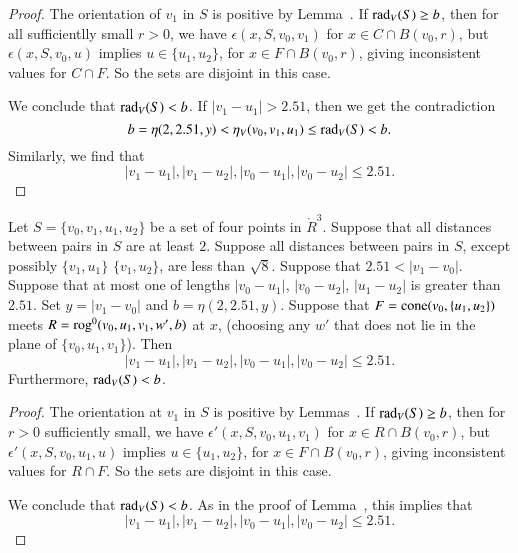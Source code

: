 \begin{proof}  
The orientation
of $v_1$ in $S$ is positive by Lemma~.
 If $\operatorname{rad}_V(S)\ge b$, then for all sufficientlly small $r>0$, we have
$\epsilon(x,S,v_0,v_1)$ for $x\in C\cap B(v_0,r)$, 
but $\epsilon(x,S,v_0,u)$ implies $u\in\{u_1,u_2\}$,
for $x\in F\cap B(v_0,r)$, giving inconsistent values for $C\cap F$.  So
the sets are disjoint in this case.  

We conclude that $\operatorname{rad}_V(S) < b$.
If $|v_1-u_1| > 2.51$, then we get the contradiction
$$b = \eta(2,2.51,y) < \eta_V(v_0,v_1,u_1)\le \operatorname{rad}_V(S) < b.$$
Similarly, we find that
   $$
   |v_1-u_1|,|v_1-u_2|,|v_0-u_1|,|v_0-u_2| \le 2.51.
   $$
\end{proof}

\newpage

\begin{lemma}
 Let $S=\{v_0,v_1,u_1,u_2\}$ be a set of four points
in $\ring{R}^3$.  
Suppose that all distances between pairs in $S$ are at least $2$.
Suppose all distances between pairs in $S$, except possibly $\{v_1,u_1\}$
$\{v_1,u_2\}$, are
less than $\sqrt8$.
Suppose that $2.51 < |v_1-v_0|$.
Suppose that at most one of lengths $|v_0-u_1|$,
$|v_0-u_2|$, $|u_1-u_2|$ is greater than $2.51$.
%
Set $y=|v_1-v_0|$ and $b=\eta(2,2.51,y)$.
Suppose that $F={\operatorname{cone}}(v_0,\{u_1,u_2\})$ meets
$R={\operatorname{rog}}^0(v_0,u_1,v_1,w',b)$ at $x$, (choosing any $w'$ that
does not lie in the plane of $\{v_0,u_1,v_1\}$).
Then 
  $$
  |v_1-u_1|,|v_1-u_2|,|v_0-u_1|,|v_0-u_2|\le 2.51.
  $$
Furthermore, $\operatorname{rad}_V(S) < b$. 
\end{lemma}

\begin{proof}  
The orientation
at $v_1$ in $S$ is positive by Lemmas~.
If $\operatorname{rad}_V(S)\ge b$, then for $r>0$ sufficiently small, we have
$\epsilon'(x,S,v_0,u_1,v_1)$ for $x\in R\cap B(v_0,r)$, 
but $\epsilon'(x,S,v_0,u_1,u)$ implies $u\in\{u_1,u_2\}$,
for $x\in F\cap B(v_0,r)$, giving inconsistent values for $R\cap F$.  So
the sets are disjoint in this case.  

We conclude that $\operatorname{rad}_V(S) < b$.
As in the proof of Lemma~,
this implies that
   $$
   |v_1-u_1|,|v_1-u_2|,|v_0-u_1|,|v_0-u_2| \le 2.51.
   $$
\end{proof}

\newpage

